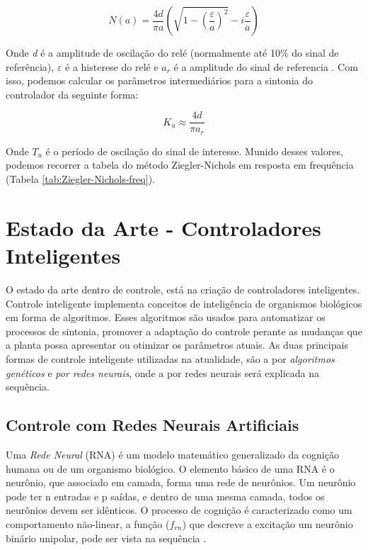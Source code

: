 \begin{equation}\label{eq:n(a)}
  N(a)=\frac{4d}{\pi a}\left(\sqrt{1-\left(\frac{\varepsilon}{a}\right)^{2}}-i\frac{\varepsilon}{a}\right) 
\end{equation}

Onde \textit{d} é a amplitude de oscilação do relé (normalmente até 10\% do sinal de referência), \textit{$\varepsilon$} é a histerese do relé e \textit{$a_r$} é a amplitude do sinal de referencia \cite{Levine1996}. Com isso, podemos calcular os parâmetros intermediários para a sintonia do controlador da seguinte forma:

\begin{equation}
  K_u \approx \frac{4d}{\pi a_r}
\end{equation}

Onde $T_u$ é o período de oscilação do sinal de interesse. Munido desses valores, podemos recorrer a tabela do método Ziegler-Nichols em resposta em frequência (Tabela \ref{tab:Ziegler-Nichols-freq}).



\section{Estado da Arte - Controladores Inteligentes}

O estado da arte dentro de controle, está na criação de controladores inteligentes. Controle inteligente implementa conceitos de inteligência de organismos biológicos em forma de algoritmos. Esses algoritmos são usados para automatizar os processos de sintonia, promover a adaptação do controle perante as mudanças que a planta possa apresentar ou otimizar os parâmetros atuais. As duas principais formas de controle inteligente utilizadas na atualidade, são a por \textit{algoritmos genéticos} e \textit{por redes neurais}, onde a por redes neurais será explicada na sequência.



\subsection{Controle com Redes Neurais Artificiais}  %

Uma \textit{Rede Neural} (RNA) é um modelo matemático generalizado da cognição humana ou de um organismo biológico. O elemento básico de uma RNA é o neurônio, que associado em camada, forma uma rede de neurônios. Um neurônio pode ter n entradas e p saídas, e dentro de uma mesma camada, todos os neurônios devem ser idênticos. O processo de cognição é caracterizado como um comportamento não-linear, a função ($f_{rn}$) que descreve a excitação um neurônio binário unipolar,  pode ser vista na sequência \cite{Unal2013}. 

